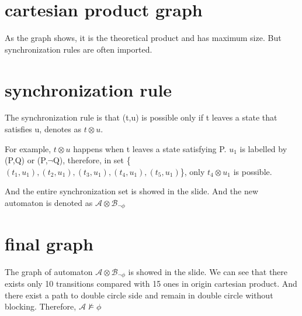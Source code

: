 \documentclass{article}
\begin{document}
    \section{cartesian product graph}
        As the graph shows, it is the theoretical product and has maximum size. But synchronization rules are often imported.

    \section{synchronization rule}
        The synchronization rule is that (t,u) is possible only if t leaves a state that satisfies u, denotes as $t\otimes u$.

        For example,  $t\otimes u$ happens when t leaves a state satisfying P. $u_1$ is labelled by (P,Q) or (P,$\neg$Q), therefore, in set \{$(t_1,u_1),(t_2,u_1),(t_3,u_1),(t_4,u_1),(t_5,u_1)$\}, only $t_4\otimes u_1$ is possible.

        And the entire synchronization set is showed in the slide. And the new automaton is denoted as $\mathcal{A}\otimes\mathcal{B}_{\neg\phi}$

    \section{final graph}
        The graph of automaton $\mathcal{A}\otimes\mathcal{B}_{\neg\phi}$ is showed in the slide. We can see that there exists only 10 transitions compared with 15 ones in origin cartesian product. And there exist a path to double circle side and remain in double circle without blocking. Therefore,  $\mathcal{A}\nvDash\phi$
\end{document}
